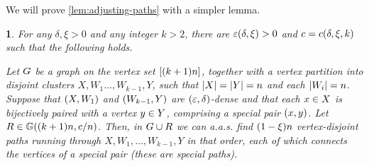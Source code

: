 \documentclass[11pt,english]{article}
\theoremstyle{plain}
\theoremstyle{plain}
\theoremstyle{plain}
\newtheorem{lem}[thm]{\protect\lemmaname}
\theoremstyle{plain}
\theoremstyle{plain}
\theoremstyle{definition}
\theoremstyle{definition}
\theoremstyle{remark}
\theoremstyle{remark}
\theoremstyle{plain}
\theoremstyle{definition}
\theoremstyle{definition}
\theoremstyle{plain}
\theoremstyle{plain}
\theoremstyle{plain}
\newtheorem{mylem}[mythm]{\protect\lemmaname}
\renewenvironment{lem}{\begin{mylem}}{\end{mylem}}
\theoremstyle{plain}
\theoremstyle{remark}
\theoremstyle{plain}
\theoremstyle{definition}
\let\originalleft\left
\let\originalright\right
\renewcommand{\left}{\mathopen{}\mathclose\bgroup\originalleft}
\renewcommand{\right}{\aftergroup\egroup\originalright}
\providecommand{\lemmaname}{Lemma}
\begin{document}
We will prove \ref{lem:adjusting-paths} with a simpler lemma.
\begin{lem}
\label{lem:adjusting-paths-more-basic}For any $\delta,\xi>0$ and
any integer $k>2$, there are $\varepsilon\left(\delta,\xi\right)>0$
and $\c=\c\left(\delta,\xi,k\right)$ such that the following holds.

Let $G$ be a graph on the vertex set $\range{\left(k+1\right)n}$,
together with a vertex partition into disjoint clusters $X,W_{1}\dots,W_{k-1},Y$,
such that $\left|X\right|=\left|Y\right|=n$ and each $\left|W_{i}\right|=n$.
Suppose that $\left(X,W_{1}\right)$ and $\left(W_{k-1},Y\right)$
are $\left(\varepsilon,\delta\right)$-dense and that each $x\in X$
is bijectively paired with a vertex $y\in Y$, comprising a \emph{special
pair} $\left(\x,\y\right)$. Let $\R\in\GG\left(\left(k+1\right)n,\c/n\right)$.
Then, in $G\cup R$ we can a.a.s. find $\left(1-\xi\right)n$ vertex-disjoint
paths running through $X,W_{1},\dots,W_{k-1},Y$ in that order, each
of which connects the vertices of a special pair (these are \emph{special
paths}).\end{lem}
\end{document}
